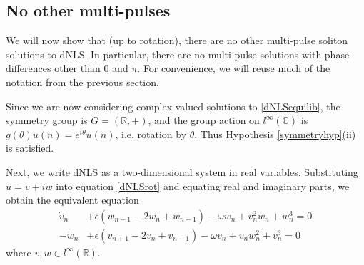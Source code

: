 \documentclass[12pt]{article}
\def\R{{\mathbb R}}
\def\C{{\mathbb C}}
\begin{document}
\subsection{No other multi-pulses}

We will now show that (up to rotation), there are no other multi-pulse soliton solutions to dNLS. In particular, there are no multi-pulse solutions with phase differences other than $0$ and $\pi$. For convenience, we will reuse much of the notation from the previous section. 

Since we are now considering complex-valued solutions to \eqref{dNLSequilib}, the symmetry group is $G = (\R, +)$, and the group action on $l^\infty(\C)$ is $g(\theta)u(n) = e^{i \theta}u(n)$, i.e. rotation by $\theta$. Thus Hypothesis \ref{symmetryhyp}(ii) is satisfied.

Next, we write dNLS as a two-dimensional system in real variables. Substituting $u = v + i w$ into equation \eqref{dNLSrot} and equating real and imaginary parts, we obtain the equivalent equation
\begin{equation}\label{dNLSreal}
\begin{aligned}
\dot{v}_n  &+ \epsilon (w_{n+1} - 2 w_n + w_{n-1}) - \omega w_n + v_n^2 w_n + w_n^3 = 0 \\
-\dot{w}_n &+ \epsilon (v_{n+1} - 2 v_n + v_{n-1}) - \omega v_n + v_n w_n^2 + v_n^3 = 0
\end{aligned}
\end{equation}
where $v, w \in l^\infty(\R)$. 
\end{document}

